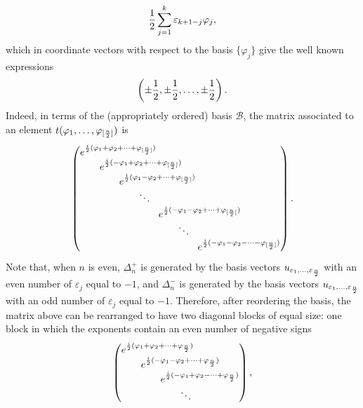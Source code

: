 \documentclass[10pt,a4paper]{amsart}
\numberwithin{equation}{section}
\begin{document}
\begin{gather*}{1\over 2}\sum_{j=1}^{k}\varepsilon_{k+1-j}\varphi_j,\end{gather*}
which in coordinate vectors with respect to the basis $\{\varphi_j\}$ give the well known expressions
\begin{gather*}\left(\pm{1\over 2},\pm{1\over 2},\dots,\pm{1\over 2}\right).\end{gather*}
Indeed, in terms of the (appropriately ordered) basis $\mathcal{B}$, the matrix associated to an element $t(\varphi_1,\dots,\varphi_{[{n\over 2}]})$ is
\begin{gather*}
\left(\begin{array}{@{}l@{}}
e^{{i\over 2}(\varphi_1+\varphi_2+\cdots+\varphi_{[{n\over 2}]})} \\
\qquad e^{{i\over 2}(-\varphi_1+\varphi_2+\cdots+\varphi_{[{n\over 2}]})} \\
\qquad\qquad e^{{i\over 2}(\varphi_1-\varphi_2+\cdots+\varphi_{[{n\over 2}]})} \\
\qquad\qquad\qquad \ddots \\
\qquad\qquad\qquad\qquad e^{{i\over 2}(-\varphi_1-\varphi_2+\cdots+\varphi_{[{n\over 2}]})} \\
\qquad\qquad\qquad\qquad\qquad \ddots \\
\qquad\qquad\qquad\qquad\qquad\qquad e^{{i\over 2}(-\varphi_1-\varphi_2-\cdots-\varphi_{[{n\over 2}]})}
\end{array}\right).
\end{gather*}
Note that, when $n$ is even, $\Delta_n^+$ is generated by the basis vectors $u_{\varepsilon_1,\dots,\varepsilon_{{n\over 2}}}$ with an even number
of $\varepsilon_j$ equal to $-1$, and $\Delta_n^-$ is generated by the basis vectors $u_{\varepsilon_1,\dots,\varepsilon_{{n\over 2}}}$ with an odd number of $\varepsilon_j$ equal to $-1$. Therefore, after reordering the basis, the matrix above can be rearranged to have two diagonal blocks of equal size: one block in which the exponents contain an even number of negative signs
\begin{gather*}
 \left(\begin{array}{@{}l@{}}
e^{{i\over 2}(\varphi_1+\varphi_2+\cdots+\varphi_{{n\over 2}})} \\
\qquad e^{{i\over 2}(-\varphi_1-\varphi_2+\cdots+\varphi_{{n\over 2}})} \\
\qquad\qquad e^{{i\over 2}(-\varphi_1+\varphi_2-\cdots+\varphi_{{n\over 2}})} \\
\qquad\qquad\qquad \ddots
 \end{array}\right),
\end{gather*}
\end{document}
